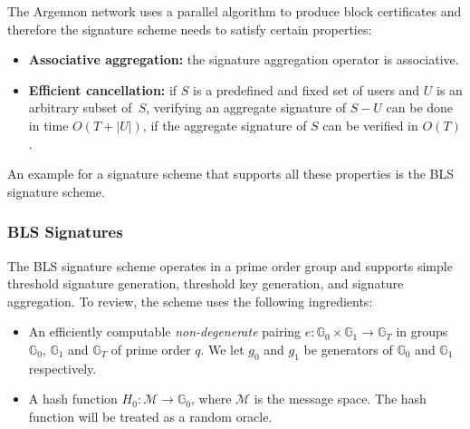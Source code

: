 The Argennon network uses a parallel algorithm to produce block certificates and therefore the signature scheme needs
to satisfy certain properties:
\begin{itemize}
    \item \textbf{Associative aggregation:} the signature aggregation operator is associative.
    \item \textbf{Efficient cancellation:} if $S$ is a predefined and fixed set of users and $U$ is an arbitrary subset
    of~$S$, verifying an aggregate signature of $S-U$ can be done in time $O(T+|U|)$, if the aggregate
    signature of $S$ can be verified in $O(T)$.
\end{itemize}

An example for a signature scheme that supports all these properties is the BLS signature scheme.

\subsubsection{BLS Signatures}

The BLS signature scheme operates in a prime order group and supports simple threshold signature generation,
threshold key generation, and signature aggregation. To review, the scheme uses the following ingredients:

\newcommand{\G}{\mathbb{G}}
\newcommand{\Z}{\mathbb{Z}}
\newcommand{\adv}{{\cal A}}
\newcommand{\bdv}{{\cal B}}
\newcommand{\deq}{\mathrel{\mathop:}=}
\newcommand{\SK}{\mathit{sk}}
\newcommand{\PK}{\mathit{pk}}
\newcommand{\C}{\mathit{cert}}
\newcommand{\APK}{\mathit{apk}}
\newcommand{\DPK}{\mathit{\Delta pk}}
\newcommand{\MM}{\mathcal{M}}
\newcommand{\xwedge}{\, \operatorname{\text{$\wedge$}}\, }
\newcommand{\abs}[1]{\lvert #1 \rvert}
\newcommand{\Hm}{H_0}
\newcommand{\Hpk}{H_1}
\newcommand{\qHpk}{Q_{\Hpk}}
\newcommand{\qHm}{Q_{\Hm}}
\newcommand{\qsig}{Q_{\text{sig}}}

\begin{itemize}
    \item An efficiently computable \emph{non-degenerate} pairing $e:\G_0 \times \G_1 \to \G_T$
    in groups $\G_0$, $\G_1$ and $\G_T$ of prime order $q$. We let $g_0$ and $g_1$ be generators
    of $\G_0$ and $\G_1$ respectively.
    \item A hash function $H_0: \mathcal{M} \rightarrow \mathbb{G}_0$, where $\mathcal{M}$ is the message space.
    The hash function will be treated as a random oracle.
\end{itemize}

